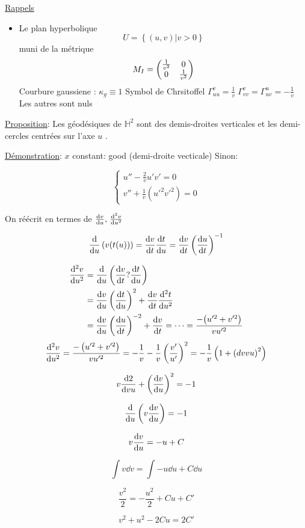 


\underline{Rappels} 

\begin{itemize}
	\item Le plan hyperbolique $$U = \left\{ (u,v) | v > 0 \right\} $$ muni de la métrique $$M_I = \begin{pmatrix} \frac{1}{v^2} & 0 \\ 0 & \frac{1}{v^2}  \end{pmatrix}$$ Courbure gaussiene : $\kappa_g \equiv 1$ Symbol de Chrsitoffel $\Gamma_{uu}^{v}=\frac{1}{v} \;\Gamma_{vv}^{v}=\Gamma_{uv}^{u}=-\frac{1}{v} $ Les autres sont nuls   
\end{itemize}

\underline{Proposition}: Les géodésiques de $\mathbb{H}^{2} $ sont des demis-droites verticales et les demi-cercles centrées sur l'axe $u$ .

\underline{Démonstration}: $x$ constant: good (demi-droite vecticale)
Sinon: 

$$\begin{cases}
	u'' - \frac{2}{v} u'v' = 0 \\ v'' + \frac{1}{v} (u'^2 v'^2) = 0	
\end{cases}$$ 


On réécrit en termes de $\dv{v}{u},\,\dv[2]{v}{u}$ 

$$\dv{u} \left( v(t(u)) \right)  = \dv{v}{t} \dv{t}{u} = \dv{v}{t} \left( \dv{u}{t} \right)^{-1}$$ 

$$\begin{aligned}
	\dv[2]{v}{u} &= \dv{u}\left( \dv{v}{t}?\dv{t}{u} \right) \\ &= \dv{v}{u} \left( \dv{t}{u} \right)^2 + \dv{v}{t}\dv[2]{t}{u} \\ &= \dv{v}{u} \left( \dv{u}{t} \right)^{-2} + \dv{v}{t} = \dotsb = \frac{-\qty(u'^2+v'^2)}{vu'^2}  \\ 
\end{aligned}$$
$$\dv[2]{v}{u} = \frac{- \left( u'^2 + v'^2 \right) }{vu'^2} =- \frac{1}{v} - \frac{1}{v} \left( \frac{v'}{u'}  \right)^2 = - \frac{1}{v} \left(  1 + \left( dv v u \right)^2 \right)   $$ 

$$v \dv{2}{vu} + \left( \dv{v}{u}  \right)^2 =-1$$ 

$$\dv{u} \left( v \dv{v}{u}  \right)  = -1$$ 

$$v \dv{v}{u} = -u +C$$ 

$$\int v \dd v = \int -u \dd u + C \dd u$$ 

$$\frac{v^2}{2} = - \frac{u^2}{2}  + Cu + C'$$ 

$$v^2 + u^2 -2Cu = 2 C'$$ 

